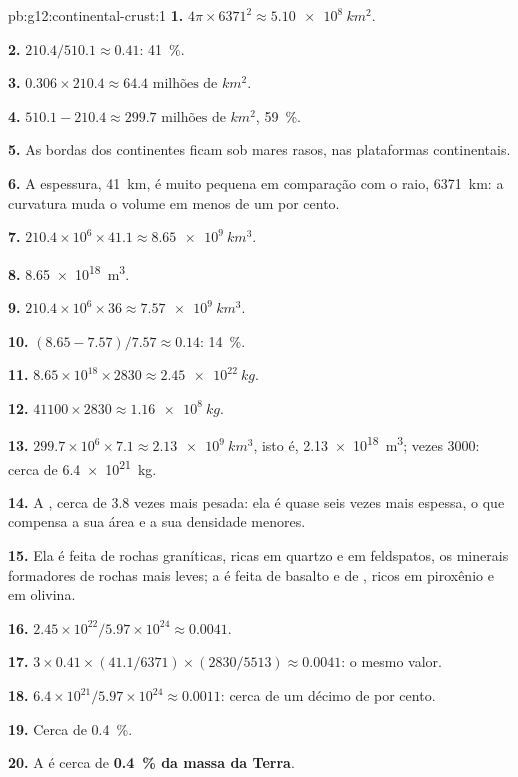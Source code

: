 \begin{solution}{pb:g12:continental-crust:1}
\textbf{1.} $4\pi \times 6371^2 \approx \qty{5.10e8}{km^2}$.

\textbf{2.} $210.4/510.1 \approx 0.41$: \qty{41}{\percent}.

\textbf{3.} $0.306 \times 210.4 \approx \num{64.4}\text{ milhões de }\unit{km^2}$.

\textbf{4.} $510.1 - 210.4 \approx \num{299.7}\text{ milhões de }\unit{km^2}$,
\qty{59}{\percent}.

\textbf{5.} As bordas dos continentes ficam sob mares rasos, nas
plataformas continentais.

\textbf{6.} A espessura, \qty{41}{km}, é muito pequena em comparação com o
raio, \qty{6371}{km}: a curvatura muda o volume em menos de um por cento.

\textbf{7.} $210.4 \times 10^6 \times 41.1 \approx \qty{8.65e9}{km^3}$.

\textbf{8.} \qty{8.65e18}{m^3}.

\textbf{9.} $210.4 \times 10^6 \times 36 \approx \qty{7.57e9}{km^3}$.

\textbf{10.} $(8.65 - 7.57)/7.57 \approx 0.14$: \qty{14}{\percent}.

\textbf{11.} $8.65 \times 10^{18} \times 2830 \approx \qty{2.45e22}{kg}$.

\textbf{12.} $41100 \times 2830 \approx \qty{1.16e8}{kg}$.

\textbf{13.} $299.7 \times 10^6 \times 7.1 \approx \qty{2.13e9}{km^3}$, isto
é, \qty{2.13e18}{m^3}; vezes 3000: cerca de \qty{6.4e21}{kg}.

\textbf{14.} A , cerca de 3.8 vezes mais pesada: ela é
quase seis vezes mais espessa, o que compensa a sua área e a sua densidade
menores.

\textbf{15.} Ela é feita de rochas graníticas, ricas em quartzo e em
feldspatos, os minerais formadores de rochas mais leves; a  é
feita de basalto e de , ricos em piroxênio e em olivina.

\textbf{16.} $2.45 \times 10^{22}/5.97 \times 10^{24} \approx 0.0041$.

\textbf{17.} $3 \times 0.41 \times (41.1/6371) \times (2830/5513) \approx
0.0041$: o mesmo valor.

\textbf{18.} $6.4 \times 10^{21}/5.97 \times 10^{24} \approx 0.0011$: cerca
de um décimo de por cento.

\textbf{19.} Cerca de \qty{0.4}{\percent}.

\textbf{20.} A  é cerca de \textbf{\qty{0.4}{\percent} da
massa da Terra}.
\end{solution}

